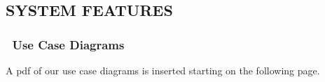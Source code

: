 \documentclass[twoside,letterpaper,pdftex]{article}
\begin{document}
\bigskip


\bigskip

\bigskip
\clearpage\setcounter{page}{1}\pagestyle{Convertiv}

\bigskip


\clearpage\setcounter{page}{1}\pagestyle{Convertv}
\subsection[SYSTEM FEATURES]{\rmfamily\bfseries\color{black} SYSTEM FEATURES}
\hypertarget{RefHeading21659017292}{}{\itshape\color{black}
}

\subsubsection[\ Use Case Diagrams]{\foreignlanguage{english}{\ Use Case Diagrams}}
\hypertarget{RefHeading21859017292}{}{\color{black}
A pdf of our use case diagrams is inserted starting on the following page.}




\bigskip
\end{document}
